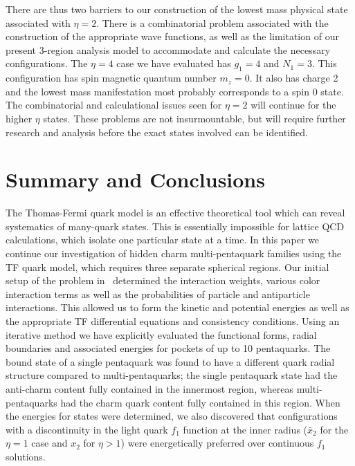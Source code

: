 \documentclass[fleqn]{article}
\begin{document}
There are thus two barriers to our construction of the lowest mass physical state associated with $\eta=2$. There is a combinatorial problem associated with the construction of the appropriate wave functions, as well as the limitation of our present 3-region analysis model to accommodate and calculate the necessary configurations. The $\eta=4$ case we have evaluated has $g_1=4$ and $N_1=3$. This configuration has spin magnetic quantum number $m_z=0$. It also has charge 2 and the lowest mass manifestation most probably corresponds to a spin 0 state. The combinatorial and calculational issues seen for $\eta=2$ will continue for the higher $\eta$ states. These problems are not insurmountable, but will require further research and analysis before the exact states involved can be identified.


\section{Summary and Conclusions}

The Thomas-Fermi quark model is an effective theoretical tool which can reveal systematics of many-quark states. This is essentially impossible for lattice QCD calculations, which isolate one particular state at a time. In this paper we continue our investigation of hidden charm multi-pentaquark families using the TF quark model, which requires three separate spherical regions. Our initial setup of the problem in~\cite{giri2021investigation} determined the interaction weights, various color interaction terms as well as the probabilities of particle and antiparticle interactions. This allowed us to form the kinetic and potential energies as well as the appropriate TF differential equations and consistency conditions. Using an iterative method we have explicitly evaluated the functional forms, radial boundaries and associated energies for pockets of up to 10 pentaquarks. The bound state of a single pentaquark was found to have a different quark radial structure compared to multi-pentaquarks; the single pentaquark state had the anti-charm content fully contained in the innermost region, whereas multi-pentaquarks had the charm quark content fully contained in this region. When the energies for states were determined, we also discovered that configurations with a discontinuity in the light quark $f_1$ function at the inner radius ($\bar{x}_2$ for the $\eta = 1$ case and $x_2$ for $\eta> 1$) were energetically preferred over continuous $f_1$ solutions.
\end{document}
